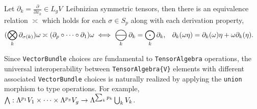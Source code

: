 \documentclass{juliacon}
\DeclareMathOperator*{\bigominus}{\scalerel*{\ominus}{\bigodot}}
\begin{document}
\begin{definition}
	Let $\partial_k = \frac\partial{\partial x_k}\in L_gV\,$ Leibnizian symmetric tensors, then there is an equivalence relation $\asymp$ which holds for each $\sigma\in S_p$ along with each derivation property,
	\begin{align*}
		(\bigotimes_k \partial_{\sigma(k)})\omega &\asymp (\partial_p \circ \dots\circ  \partial_1)\omega \iff \bigominus_k\partial_k = \bigodot_k\partial_k, & \partial_k(\omega\eta) &= \partial_k(\omega)\eta + \omega\partial_k(\eta).
	\end{align*}
\end{definition}




Since \verb`VectorBundle` choices are fundamental to \verb`TensorAlgebra` operations, the universal interoperability between \verb`TensorAlgebra{V}` elements with different associated \verb`VectorBundle` choices is naturally realized by applying the \verb`union` morphism to type operations.
For example, $\bigwedge :\Lambda^{p_1}V_1\times\dots\times\Lambda^{p_g}V_g \rightarrow \Lambda^{\sum_kp_k}\bigcup_k V_k$. 
\end{document}
